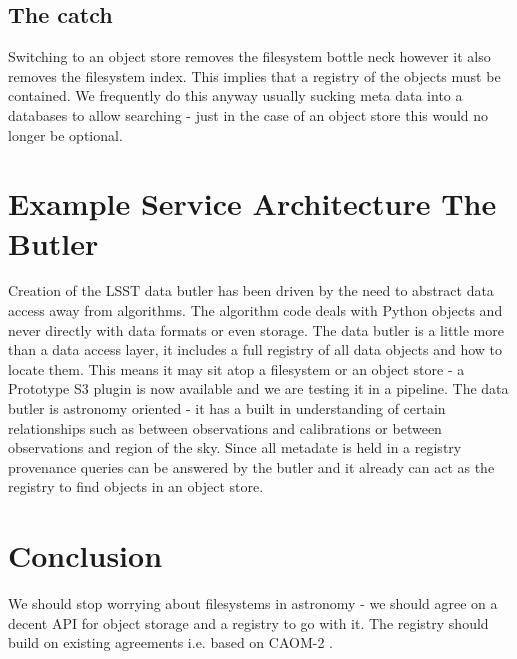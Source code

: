 \subsection{The catch }
Switching to an object store removes the filesystem bottle neck however it also removes the filesystem index. This implies that a registry of the objects must be contained. We frequently do this anyway usually sucking meta data into a databases to allow searching - just in the case of an object store this would no longer be  optional.

\section{Example Service Architecture The Butler}
Creation of the LSST data butler \citep{2018arXiv181208085J} has been driven by the need to abstract data access away from algorithms.
The algorithm code deals with Python objects and never directly with data formats or even storage. The data butler is a little more than a data access layer, it includes a full registry of all data objects and how to locate them. This means it may sit atop a filesystem or an object store - a Prototype S3 plugin is now available and we are testing it in a pipeline.  The data butler is astronomy oriented - it has a built in understanding of certain relationships such as between observations and calibrations or between observations and region of the sky. Since all metadate is held in a registry provenance queries can be answered by the butler and it already can act as the registry to find objects in an object store.

\section{Conclusion}
We should stop worrying about filesystems in astronomy - we should agree on a decent API for object storage and a registry to go with it.
The registry should build on existing agreements i.e. based on CAOM-2 \citep{2007ASPC..376..347D}.
